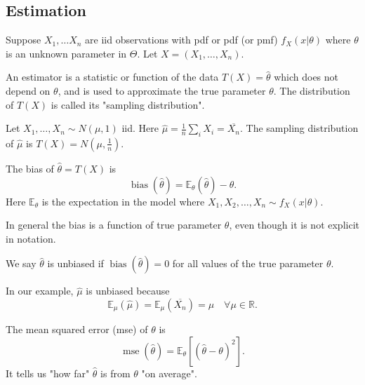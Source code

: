 \documentclass[a4paper]{scrartcl}
\begin{document}
\subsection{Estimation}
Suppose $X_1 , \ldots X_n$ are iid observations with pdf or pdf (or pmf) $f_{X}(x| \theta)$ where $\theta$ is an unknown parameter in $\Theta$. Let $X=(X_1 , \ldots , X_{n})$. 
\begin{definition}[Estimator]
     An estimator is a statistic or function of the data $T (X)=\hat{\theta}$ which does not depend on $\theta$, and is used to approximate the true parameter $\theta$. The distribution of $T (X)$ is called its "sampling distribution". 
\end{definition}
\begin{example}
     Let $X_1 , \ldots ,X_{n} \sim N (\mu,1)$ iid. Here $\hat{\mu}=\frac{1}{n}\sum_{i}^{}X_{i}=\overline{X_{n}}$. The sampling distribution of $\hat{\mu} $ is $T (X)=N (\mu, \frac{1}{n})$.   
\end{example}
\begin{definition}[Bias]
     The bias of $\hat{\theta}=T (X)$ is \[
     \operatorname{bias}(\hat{\theta})=\mathbb{E}_{\theta} (\hat{\theta})-\theta
     .\] Here $\mathbb{E}_{\theta}$ is the expectation in the model where $X_1 , X_2 , \ldots ,X_n \sim f_{X}(x|\theta)$.
\end{definition}
\begin{remark}
     In general the bias is a function of true parameter $\theta$, even though it is not explicit in notation.  
\end{remark}
\begin{definition}
     We say $\hat{\theta}$ is unbiased if $\operatorname{bias}(\hat{\theta})=0$ for all values of the true parameter $\theta$. 
\end{definition}
In our example, $\hat{\mu}$ is unbiased because \[
\mathbb{E}_{\mu}(\hat{\mu})=\mathbb{E}_{\mu}(\overline{X_{n}})=\mu \quad \forall \mu \in \mathbb{R}
.\]  
\begin{definition}
     The mean squared error (mse) of $\theta$ is \[
     \operatorname{mse}(\hat{\theta})=\mathbb{E}_{\theta} \left[ (\hat{\theta}-\theta)^2\right]
     .\] 
     It tells us "how far" $\hat{\theta}$ is from $\theta$ "on average".
\end{definition}
\end{document}
